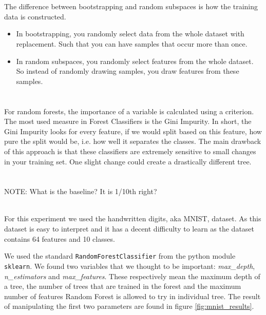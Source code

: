\documentclass[11pt]{article}
\begin{document}
\section{}
The difference between bootstrapping and random subspaces is how the training data is constructed. 
\begin{itemize}
	\item In bootstrapping, you randomly select data from the whole dataset with replacement. Such that you can have samples that occur more than once.
	\item In random subspaces, you randomly select features from the whole dataset. So instead of randomly drawing samples, you draw features from these samples.
\end{itemize}


\section{}
For random forests, the importance of a variable is calculated using a criterion. The most used measure in Forest Classifiers is the Gini Impurity. In short, the Gini Impurity looks for every feature, if we would split based on this feature, how pure the split would be, i.e. how well it separates the classes. The main drawback of this approach is that these classifiers are extremely sensitive to small changes in your training set. One slight change could create a drastically different tree.

\section{}
NOTE: What is the baseline? It is 1/10th right?

~\\
For this experiment we used the handwritten digits, aka MNIST, dataset. As this dataset is easy to interpret and it has a decent difficulty to learn as the dataset contains 64 features and 10 classes.

We used the standard \texttt{RandomForestClassifier} from the python module \texttt{sklearn}. We found two variables that we thought to be important: \textit{max\_depth}, \textit{n\_estimators} and \textit{max\_features}. These respectively mean the maximum depth of a tree, the number of trees that are trained in the forest and the maximum number of features Random Forest is allowed to try in individual tree. The result of manipulating the first two parameters are found in figure \ref{fig:mnist_results}.
\end{document}

